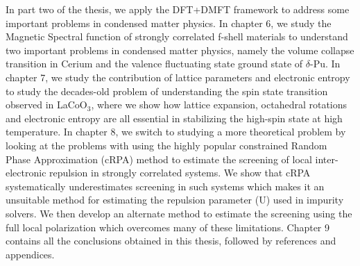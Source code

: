 \documentclass[10pt]{ruthesis}
\begin{document}
{In part two of the thesis, we apply the DFT+DMFT framework to address some important problems in condensed matter physics. In chapter 6, we study the Magnetic Spectral function of strongly correlated f-shell materials to understand two important problems in condensed matter physics, namely the volume collapse transition in Cerium and the valence fluctuating state ground state of $\delta$-Pu. In chapter 7, we study the contribution of lattice parameters and electronic entropy to study the decades-old problem of understanding the spin state transition observed in LaCoO$_3$, where we show how lattice expansion, octahedral rotations and electronic entropy are all essential in stabilizing the high-spin state at high temperature. In chapter 8, we switch to studying a more theoretical problem by looking at the problems with using the highly popular constrained Random Phase Approximation (cRPA) method to estimate the screening of local inter-electronic repulsion in strongly correlated systems. We show that cRPA systematically underestimates screening in such systems which makes it an unsuitable method for estimating the repulsion parameter (U) used in impurity solvers. We then develop an alternate method to estimate the screening using the full local polarization which overcomes many of these limitations. Chapter 9 contains all  the conclusions obtained in this thesis, followed by references and appendices. 

 
}
\end{document}
